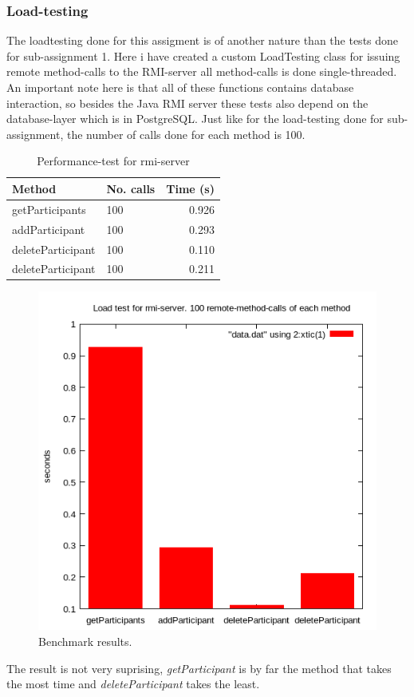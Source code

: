 \documentclass[a4paper, 11pt]{article}
\begin{document}
\subsubsection{Load-testing}
The loadtesting done for this assigment is of another nature than the tests done for sub-assignment 1. Here i have created a custom LoadTesting class for issuing remote method-calls to the RMI-server all method-calls is done single-threaded. An important note here is that all of these functions contains database interaction, so besides the Java RMI server these tests also depend on the database-layer which is in PostgreSQL. Just like for the load-testing done for sub-assignment, the number of calls done for each method is 100.\\
\begin{table}[H]
\centering
\label{Performance test for rmi-server}
\begin{tabular}{|l|l|r|}
\hline
\textbf{Method}  & \textbf{No. calls} & \textbf{Time (s)} \\ \hline
getParticipants	& 100 & 0.926 \\ \hline
addParticipant	& 100 & 0.293 \\ \hline
deleteParticipant & 100 & 0.110 \\ \hline
deleteParticipant & 100 & 0.211 \\ \hline
\end{tabular}
\caption{Performance-test for rmi-server}
\end{table}
\begin{figure}[H]
\includegraphics[scale=0.7]{rmiplot.png}
\caption{Benchmark results.}
\end{figure}
The result is not very suprising, \textit{getParticipant} is by far the method that takes the most  time and \textit{deleteParticipant} takes the least. \\
\end{document}
